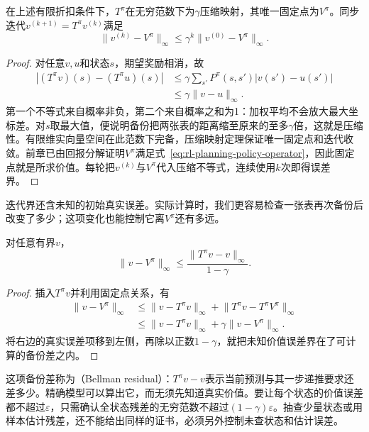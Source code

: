\begin{theorem}[策略评价的压缩性与收敛]
 \label{thm:rl-planning-policy-contraction}
 在上述有限折扣条件下，$T^\pi$在无穷范数下为$\gamma$压缩映射，其唯一固定点为$V^\pi$。同步迭代$v^{(k+1)}=T^\pi v^{(k)}$满足
 \[
 \lVert v^{(k)}-V^\pi\rVert_\infty
 \leq\gamma^k\lVert v^{(0)}-V^\pi\rVert_\infty.
 \]
\end{theorem}
\begin{proof}
 对任意$v,u$和状态$s$，期望奖励相消，故
 \[
 \begin{aligned}
 |(T^\pi v)(s)-(T^\pi u)(s)|
 &\leq\gamma\sum_{s'}P^\pi(s,s')|v(s')-u(s')|\\
 &\leq\gamma\lVert v-u\rVert_\infty.
 \end{aligned}
 \]
 第一个不等式来自概率非负，第二个来自概率之和为1：加权平均不会放大最大坐标差。对$s$取最大值，便说明备份把两张表的距离缩至原来的至多$\gamma$倍，这就是压缩性。有限维实向量空间在此范数下完备，压缩映射定理保证唯一固定点和迭代收敛。前章已由回报分解证明$V^\pi$满足式~\eqref{eq:rl-planning-policy-operator}，因此固定点就是所求价值。每轮把$v^{(k)}$与$V^\pi$代入压缩不等式，连续使用$k$次即得误差界。
\end{proof}

迭代界还含未知的初始真实误差。实际计算时，我们更容易检查一张表再次备份后改变了多少；这项变化也能控制它离$V^\pi$还有多远。

\begin{theorem}[评价残差证书]
 \label{thm:rl-planning-evaluation-residual}
 对任意有界$v$，
 \begin{equation}
 \lVert v-V^\pi\rVert_\infty
 \leq\frac{\lVert T^\pi v-v\rVert_\infty}{1-\gamma}.
 \label{eq:rl-planning-evaluation-residual}
 \end{equation}
\end{theorem}
\begin{proof}
 插入$T^\pi v$并利用固定点关系，有
 \[
 \begin{aligned}
 \lVert v-V^\pi\rVert_\infty
 &\leq\lVert v-T^\pi v\rVert_\infty+
       \lVert T^\pi v-T^\pi V^\pi\rVert_\infty\\
 &\leq\lVert v-T^\pi v\rVert_\infty+
       \gamma\lVert v-V^\pi\rVert_\infty.
 \end{aligned}
 \]
 将右边的真实误差项移到左侧，再除以正数$1-\gamma$，就把未知价值误差界在了可计算的备份差之内。
\end{proof}

这项备份差称为（Bellman residual）：$T^\pi v-v$表示当前预测与其一步递推要求还差多少。精确模型可以算出它，而无须先知道真实价值。要让每个状态的价值误差都不超过$\varepsilon$，只需确认全状态残差的无穷范数不超过$(1-\gamma)\varepsilon$。抽查少量状态或用样本估计残差，还不能给出同样的证书，必须另外控制未查状态和估计误差。

